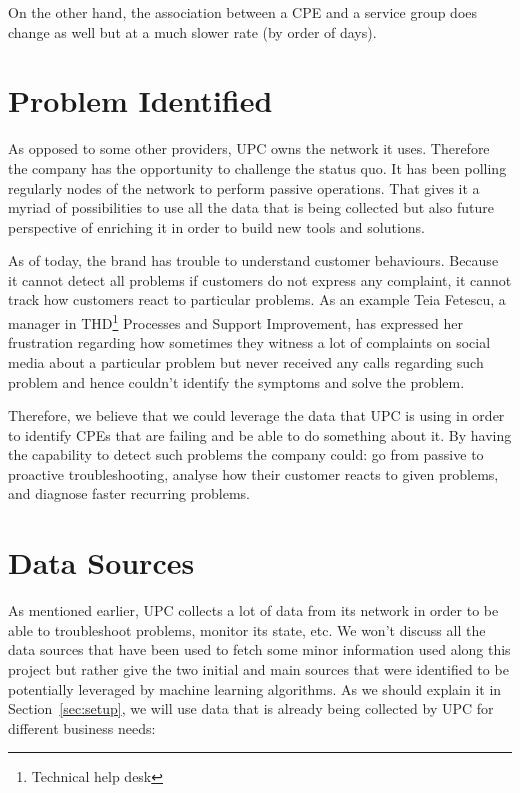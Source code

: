 On the other hand, the association between a CPE and a service group does change as well but at a much slower rate (by order of days). 

\section{Problem Identified}
As opposed to some other providers, UPC owns the network it uses. Therefore the company has the opportunity to challenge the status quo. It has been polling regularly nodes of the network to perform passive operations. That gives it a myriad of possibilities to use all the data that is being collected but also future perspective of enriching it in order to build new tools and solutions.

As of today, the brand has trouble to understand customer behaviours. Because it cannot detect all problems if customers do not express any complaint, it cannot track how customers react to particular problems. As an example Teia Fetescu, a manager in THD\footnote{Technical help desk} Processes and Support Improvement, has expressed her frustration regarding how sometimes they witness a lot of complaints on social media about a particular problem but never received any calls regarding such problem and hence couldn't identify the symptoms and solve the problem. 

Therefore, we believe that we could leverage the data that UPC is using in order to identify CPEs that are failing and be able to do something about it. By having the capability to detect such problems the company could: go from passive to proactive troubleshooting, analyse how their customer reacts to given problems, and diagnose faster recurring problems.

\section{Data Sources}
As mentioned earlier, UPC collects a lot of data from its network in order to be able to troubleshoot problems, monitor its state, etc. We won't discuss all the data sources that have been used to fetch some minor information used along this project but rather give the two initial and main sources that were identified to be potentially leveraged by machine learning algorithms. As we should explain it in Section~\ref{sec:setup}, we will use data that is already being collected by UPC for different business needs:

